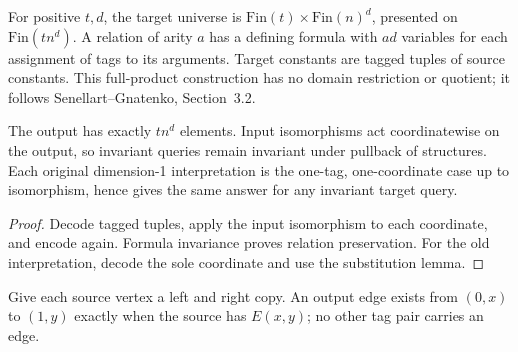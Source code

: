 \begin{definition}
  \label{def:desc-tagged-interpretation}
  \leanok
  For positive $t,d$, the target universe is
  $\mathrm{Fin}(t)\times\mathrm{Fin}(n)^d$, presented on
  $\mathrm{Fin}(t n^d)$. A relation of arity $a$ has a defining formula with
  $ad$ variables for each assignment of tags to its arguments. Target constants
  are tagged tuples of source constants. This full-product construction has no
  domain restriction or quotient; it follows Senellart--Gnatenko, Section~3.2.
\end{definition}

\begin{theorem}
  \label{thm:desc-tagged-semantics}
  \leanok
  The output has exactly $t n^d$ elements. Input isomorphisms act coordinatewise
  on the output, so invariant queries remain invariant under pullback of
  structures. Each original dimension-1 interpretation is the one-tag,
  one-coordinate case up to isomorphism, hence gives the same answer for any
  invariant target query.
\end{theorem}
\begin{proof}
  \leanok
  Decode tagged tuples, apply the input isomorphism to each coordinate, and
  encode again. Formula invariance proves relation preservation. For the old
  interpretation, decode the sole coordinate and use the substitution lemma.
\end{proof}

\begin{definition}
  \label{def:desc-double-cover}
  \leanok
  Give each source vertex a left and right copy. An output edge exists from
  $(0,x)$ to $(1,y)$ exactly when the source has $E(x,y)$; no other tag pair
  carries an edge.
\end{definition}

